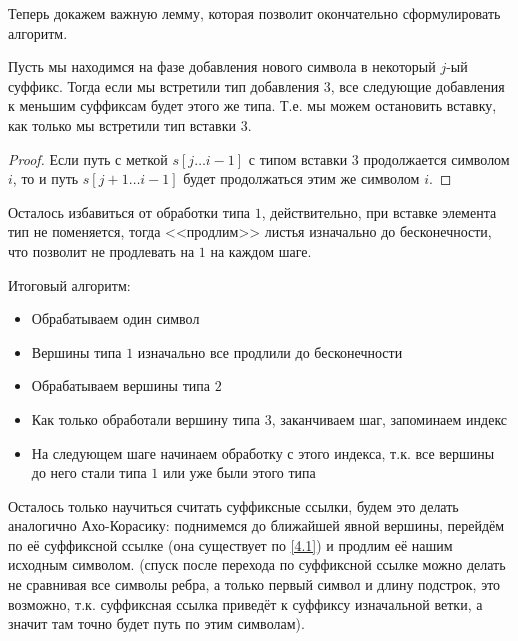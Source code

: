 Теперь докажем важную лемму, которая позволит окончательно сформулировать алгоритм.
\begin{lemma}
  Пусть мы находимся на фазе добавления нового символа в некоторый $j$-ый суффикс. Тогда если мы встретили
  тип добавления $3$, все следующие добавления к меньшим суффиксам будет этого же типа. Т.е. мы можем
  остановить вставку, как только мы встретили тип вставки $3$.
\end{lemma}
\begin{proof}
  Если путь с меткой $s[j\ldots i - 1]$ с типом вставки $3$ продолжается символом $i$, то и путь 
  $s[j + 1\ldots i - 1]$ будет продолжаться этим же символом $i$.
\end{proof}

Осталось избавиться от обработки типа $1$, действительно, при вставке элемента тип не поменяется, тогда
<<продлим>> листья изначально до бесконечности, что позволит не продлевать на $1$ на каждом шаге.

Итоговый алгоритм:
\begin{itemize}
  \item Обрабатываем один символ
  \item Вершины типа $1$ изначально все продлили до бесконечности
  \item Обрабатываем вершины типа $2$ 
  \item Как только обработали вершину типа $3$, заканчиваем шаг, запоминаем индекс
  \item На следующем шаге начинаем обработку с этого индекса, т.к. все вершины до него стали типа $1$ или уже
    были этого типа
\end{itemize}

Осталось только научиться считать суффиксные ссылки, будем это делать аналогично Ахо-Корасику: поднимемся 
до ближайшей явной вершины, перейдём по её суффиксной ссылке (она существует по \ref{4.1}) и продлим её 
нашим исходным символом. (спуск после перехода по суффиксной ссылке можно делать не сравнивая все символы
ребра, а только первый символ и длину подстрок, это возможно, т.к. суффиксная ссылка приведёт к суффиксу
изначальной ветки, а значит там точно будет путь по этим символам).

